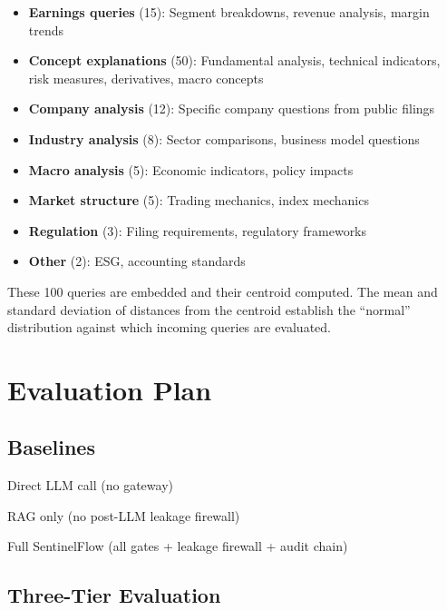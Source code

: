 \documentclass[12pt,a4paper]{article}
\begin{document}
\begin{itemize}[leftmargin=*]
    \item \textbf{Earnings queries} (15): Segment breakdowns, revenue analysis, margin trends
    \item \textbf{Concept explanations} (50): Fundamental analysis, technical indicators, risk measures, derivatives, macro concepts
    \item \textbf{Company analysis} (12): Specific company questions from public filings
    \item \textbf{Industry analysis} (8): Sector comparisons, business model questions
    \item \textbf{Macro analysis} (5): Economic indicators, policy impacts
    \item \textbf{Market structure} (5): Trading mechanics, index mechanics
    \item \textbf{Regulation} (3): Filing requirements, regulatory frameworks
    \item \textbf{Other} (2): ESG, accounting standards
\end{itemize}

These 100 queries are embedded and their centroid computed. The mean and standard deviation of distances from the centroid establish the ``normal'' distribution against which incoming queries are evaluated.


\section{Evaluation Plan}
\label{sec:eval}

\subsection{Baselines}

\begin{description}[leftmargin=*]
    \item[B0:] Direct LLM call (no gateway)
    \item[B1:] RAG only (no post-LLM leakage firewall)
    \item[B2:] Full SentinelFlow (all gates + leakage firewall + audit chain)
\end{description}

\subsection{Three-Tier Evaluation}
\end{document}
